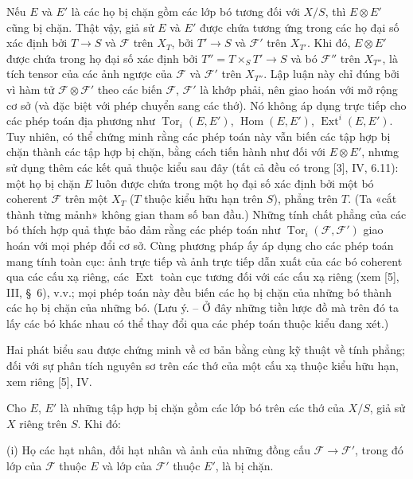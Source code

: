 Nếu $E$ và $E'$ là các họ bị chặn gồm các lớp bó tương đối với $X/S$, thì
$E\otimes E'$ cũng bị chặn. Thật vậy, giả sử $E$ và $E'$ được chứa tương ứng
trong các họ đại số xác định bởi $T\longrightarrow S$ và $\mathcal F$ trên
$X_T$, bởi $T'\longrightarrow S$ và $\mathcal F'$ trên $X_{T'}$. Khi đó,
$E\otimes E'$ được chứa trong họ đại số xác định bởi
$T''=T\times_S T'\longrightarrow S$ và bó $\mathcal F''$ trên $X_{T''}$, là
tích tensor của các ảnh ngược của $\mathcal F$ và $\mathcal F'$ trên
$X_{T''}$. Lập luận này chỉ đúng bởi vì hàm tử
$\mathcal F\otimes\mathcal F'$ theo các biến $\mathcal F$, $\mathcal F'$ là
khớp phải, nên giao hoán với mở rộng cơ sở (và đặc biệt với phép chuyển sang
các thớ). Nó không áp dụng trực tiếp cho các phép toán địa phương như
$\operatorname{Tor}_i(E,E')$, $\operatorname{Hom}(E,E')$,
$\operatorname{Ext}^i(E,E')$. Tuy nhiên, có thể chứng minh rằng các phép toán
này vẫn biến các tập hợp bị chặn thành các tập hợp bị chặn, bằng cách tiến hành
như đối với $E\otimes E'$, nhưng sử dụng thêm các kết quả thuộc kiểu sau đây
(tất cả đều có trong [3], IV, 6.11): một họ bị chặn $E$ luôn được chứa trong
một họ đại số xác định bởi một bó coherent $\mathcal F$ trên một $X_T$ ($T$
thuộc kiểu hữu hạn trên $S$), phẳng trên $T$. (Ta «cắt thành từng mảnh» không
gian tham số ban đầu.) Những
tính chất phẳng của các bó thích hợp quả thực bảo đảm rằng các phép toán như
$\operatorname{Tor}_i(\mathcal F,\mathcal F')$ giao hoán với mọi phép đổi cơ
sở. Cùng phương pháp ấy áp dụng cho các phép toán mang tính toàn cục: ảnh trực
tiếp và ảnh trực tiếp dẫn xuất của các bó coherent qua các cấu xạ riêng, các
$\operatorname{Ext}$ toàn cục tương đối với các cấu xạ riêng (xem [5], III,
\S~6), v.v.; mọi phép toán này đều biến các họ bị chặn của những bó thành các
họ bị chặn của những bó. (Lưu ý. -- Ở đây những tiền lược đồ mà trên đó ta lấy
các bó khác nhau có thể thay đổi qua các phép toán thuộc kiểu đang xét.)

Hai phát biểu sau được chứng minh về cơ bản bằng cùng kỹ thuật về tính phẳng;
đối với sự phân tích nguyên sơ trên các thớ của một cấu xạ thuộc kiểu hữu hạn,
xem riêng [5], IV.

 Cho $E$, $E'$ là những tập hợp bị chặn gồm các lớp bó
trên các thớ của $X/S$, giả sử $X$ riêng trên $S$. Khi đó:

\medskip
\noindent (i) Họ các hạt nhân, đối hạt nhân và ảnh của những đồng cấu
$\mathcal F\longrightarrow\mathcal F'$, trong đó lớp của $\mathcal F$ thuộc
$E$ và lớp của $\mathcal F'$ thuộc $E'$, là bị chặn.

